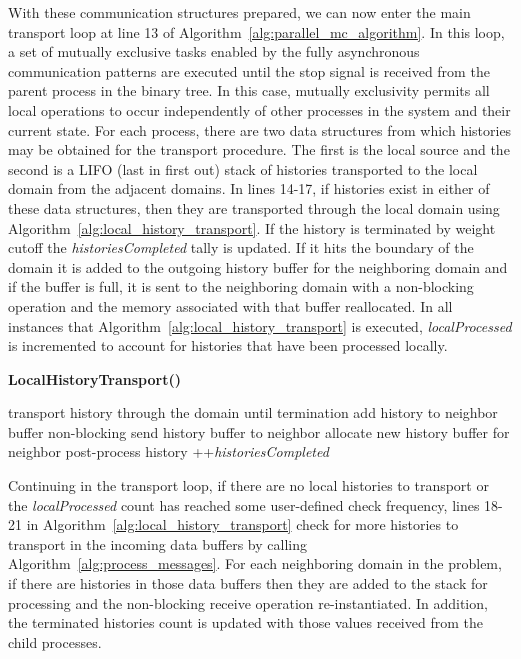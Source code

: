 \documentclass[letterpaper,11pt]{article}
\begin{document}
With these communication structures prepared, we can now enter the
main transport loop at line 13 of
Algorithm~\ref{alg:parallel_mc_algorithm}. In this loop, a set of
mutually exclusive tasks enabled by the fully asynchronous
communication patterns are executed until the stop signal is received
from the parent process in the binary tree. In this case, mutually
exclusivity permits all local operations to occur independently of
other processes in the system and their current state. For each
process, there are two data structures from which histories may be
obtained for the transport procedure. The first is the local source
and the second is a LIFO (last in first out) stack of histories
transported to the local domain from the adjacent domains. In lines
14-17, if histories exist in either of these data structures, then
they are transported through the local domain using
Algorithm~\ref{alg:local_history_transport}. If the history is
terminated by weight cutoff the \textit{historiesCompleted} tally is
updated. If it hits the boundary of the domain it is added to the
outgoing history buffer for the neighboring domain and if the buffer
is full, it is sent to the neighboring domain with a non-blocking
operation and the memory associated with that buffer reallocated. In
all instances that Algorithm~\ref{alg:local_history_transport} is
executed, \textit{localProcessed} is incremented to account for
histories that have been processed locally.

\begin{algorithm}[h!]
  \caption{\textbf{LocalHistoryTransport()}}
  \label{alg:local_history_transport}
  \begin{algorithmic}[1]
    \State transport history through the domain until termination
    \State add history to neighbor buffer
    \State non-blocking send history buffer to neighbor
    \State allocate new history buffer for neighbor
    \EndIf
    \Else
    \State post-process history
    \State ++\textit{historiesCompleted}
    \EndIf
    \EndIf
  \end{algorithmic}
\end{algorithm}

Continuing in the transport loop, if there are no local histories to
transport or the \textit{localProcessed} count has reached some
user-defined check frequency, lines 18-21 in
Algorithm~\ref{alg:local_history_transport} check for more histories
to transport in the incoming data buffers by calling
Algorithm~\ref{alg:process_messages}. For each neighboring domain in
the problem, if there are histories in those data buffers then they
are added to the stack for processing and the non-blocking receive
operation re-instantiated. In addition, the terminated histories count
is updated with those values received from the child processes.
\end{document}
